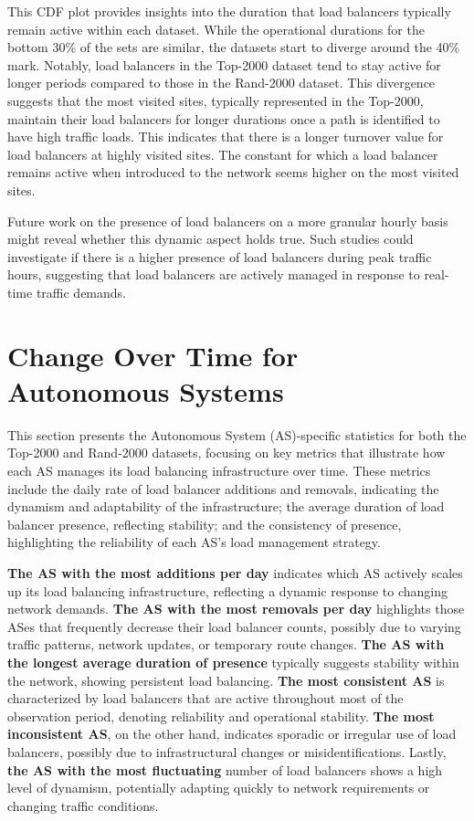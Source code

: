 \documentclass[12pt]{cwru_thesis}
\begin{document}
This CDF plot provides insights into the duration that load balancers typically remain active within each dataset. While the operational durations for the bottom 30\% of the sets are similar, the datasets start to diverge around the 40\% mark. Notably, load balancers in the Top-2000 dataset tend to stay active for longer periods compared to those in the Rand-2000 dataset. This divergence suggests that the most visited sites, typically represented in the Top-2000, maintain their load balancers for longer durations once a path is identified to have high traffic loads. This indicates that there is a longer turnover value for load balancers at highly visited sites. The constant for which a load balancer remains active when introduced to the network seems higher on the most visited sites.



Future work on the presence of load balancers on a more granular hourly basis might reveal whether this dynamic aspect holds true. Such studies could investigate if there is a higher presence of load balancers during peak traffic hours, suggesting that load balancers are actively managed in response to real-time traffic demands.


\section{Change Over Time for Autonomous Systems}

This section presents the Autonomous System (AS)-specific statistics for both the Top-2000 and Rand-2000 datasets, focusing on key metrics that illustrate how each AS manages its load balancing infrastructure over time. These metrics include the daily rate of load balancer additions and removals, indicating the dynamism and adaptability of the infrastructure; the average duration of load balancer presence, reflecting stability; and the consistency of presence, highlighting the reliability of each AS's load management strategy.

\textbf{The AS with the most additions per day} indicates which AS actively scales up its load balancing infrastructure, reflecting a dynamic response to changing network demands. \textbf{The AS with the most removals per day} highlights those ASes that frequently decrease their load balancer counts, possibly due to varying traffic patterns, network updates, or temporary route changes. \textbf{The AS with the longest average duration of presence} typically suggests stability within the network, showing persistent load balancing. \textbf{The most consistent AS} is characterized by load balancers that are active throughout most of the observation period, denoting reliability and operational stability. \textbf{The most inconsistent AS}, on the other hand, indicates sporadic or irregular use of load balancers, possibly due to infrastructural changes or misidentifications. Lastly, \textbf{the AS with the most fluctuating} number of load balancers shows a high level of dynamism, potentially adapting quickly to network requirements or changing traffic conditions.
\end{document}
